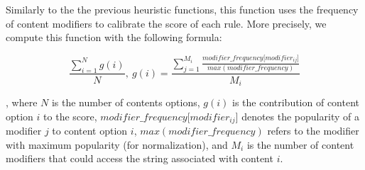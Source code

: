 \documentclass[sigconf,review, anonymous]{acmart}
\begin{document}

Similarly to the the previous heuristic functions, this function uses
the frequency of content modifiers to calibrate the score of each
rule. More precisely, we compute this function with the following
formula:

\[\frac{\sum_{i=1}^{N}g(i)}{N},~g(i)=\frac{\sum_{j=1}^{M_i}\frac{\mathit{modifier\_frequency[modifier_{ij}}]}{\mathit{max(modifier\_frequency)}}}{M_i}\]

\noindent
, where $N$ is the number of contents options, $g(i)$ is the
contribution of content option $i$ to the score,
$\mathit{modifier\_frequency[modifier_{ij}}]$ denotes the popularity
of a modifier $j$ to content option $i$,
$\mathit{max(modifier\_frequency)}$ refers to the modifier with
maximum popularity (for normalization), and $M_i$ is the number of
content modifiers that could access the string associated with content
$i$.


                                                                             
\end{document}
